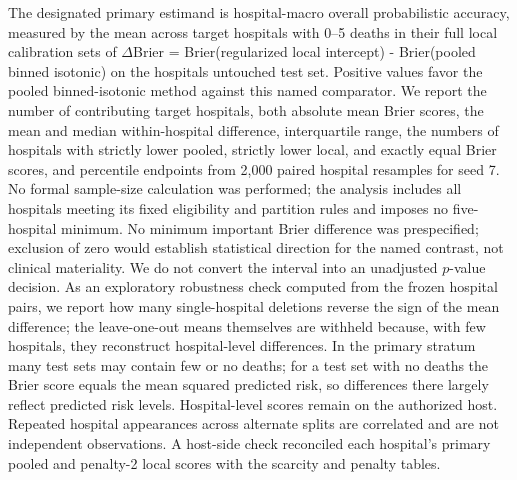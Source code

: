 \documentclass[11pt]{article}
\begin{document}
The designated primary estimand is hospital-macro overall probabilistic accuracy, measured by the mean across target hospitals with 0--5 deaths in their full local calibration sets of $\Delta$Brier = Brier(regularized local intercept) - Brier(pooled binned isotonic) on the hospital\textquotesingle s untouched test set. Positive values favor the pooled binned-isotonic method against this named comparator. We report the number of contributing target hospitals, both absolute mean Brier scores, the mean and median within-hospital difference, interquartile range, the numbers of hospitals with strictly lower pooled, strictly lower local, and exactly equal Brier scores, and percentile endpoints from 2,000 paired hospital resamples for seed 7. No formal sample-size calculation was performed; the analysis includes all hospitals meeting its fixed eligibility and partition rules and imposes no five-hospital minimum. No minimum important Brier difference was prespecified; exclusion of zero would establish statistical direction for the named contrast, not clinical materiality. We do not convert the interval into an unadjusted $p$-value decision. As an exploratory robustness check computed from the frozen hospital pairs, we report how many single-hospital deletions reverse the sign of the mean difference; the leave-one-out means themselves are withheld because, with few hospitals, they reconstruct hospital-level differences. In the primary stratum many test sets may contain few or no deaths; for a test set with no deaths the Brier score equals the mean squared predicted risk, so differences there largely reflect predicted risk levels. Hospital-level scores remain on the authorized host. Repeated hospital appearances across alternate splits are correlated and are not independent observations. A host-side check reconciled each hospital's primary pooled and penalty-2 local scores with the scarcity and penalty tables.
\end{document}
